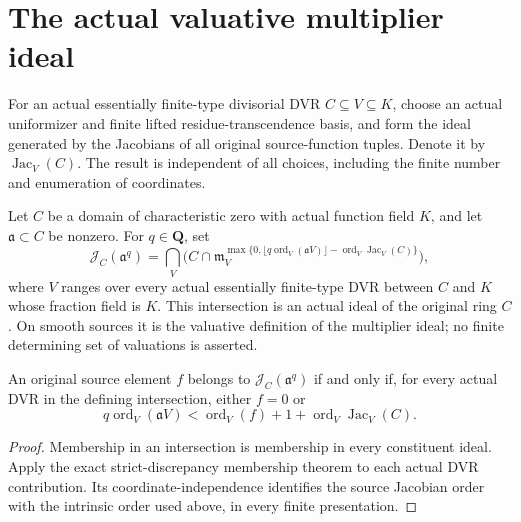 \section{The actual valuative multiplier ideal}

\begin{definition}\label{def:sc0-intrinsic-source-dvr-jacobian}
\leanok
{}
For an actual essentially finite-type divisorial DVR $C\subseteq V\subseteq K$,
choose an actual uniformizer and finite lifted residue-transcendence basis,
and form the ideal generated by the Jacobians of all original source-function
tuples. Denote it by $\operatorname{Jac}_V(C)$. The result is independent of
all choices, including the finite number and enumeration of coordinates.
\end{definition}

\begin{definition}\label{def:sc0-valuative-multiplier-ideal}
\leanok
{}
Let $C$ be a domain of characteristic zero with actual function field $K$,
and let $\mathfrak a\subset C$ be nonzero. For $q\in\mathbf Q$, set
\[
 \mathcal J_C(\mathfrak a^q)
 =\bigcap_V\bigl(C\cap\mathfrak m_V^{\max\{0,\lfloor q\operatorname{ord}_V(\mathfrak aV)\rfloor-
       \operatorname{ord}_V\operatorname{Jac}_V(C)\}}\bigr),
\]
where $V$ ranges over every actual essentially finite-type DVR between $C$
and $K$ whose fraction field is $K$. This intersection is an actual ideal
of the original ring $C$. On smooth sources it is the valuative definition
of the multiplier ideal; no finite determining set of valuations is asserted.
\end{definition}

\begin{theorem}\label{thm:sc0-valuative-multiplier-membership}
\leanok
{}
An original source element $f$ belongs to $\mathcal J_C(\mathfrak a^q)$ if
and only if, for every actual DVR in the defining intersection, either $f=0$
or
\[
 q\operatorname{ord}_V(\mathfrak aV)
 <\operatorname{ord}_V(f)+1+\operatorname{ord}_V\operatorname{Jac}_V(C).
\]
\end{theorem}
\begin{proof}
Membership in an intersection is membership in every constituent ideal.
Apply the exact strict-discrepancy membership theorem to each actual DVR
contribution. Its coordinate-independence identifies the source Jacobian
order with the intrinsic order used above, in every finite presentation.
\end{proof}

